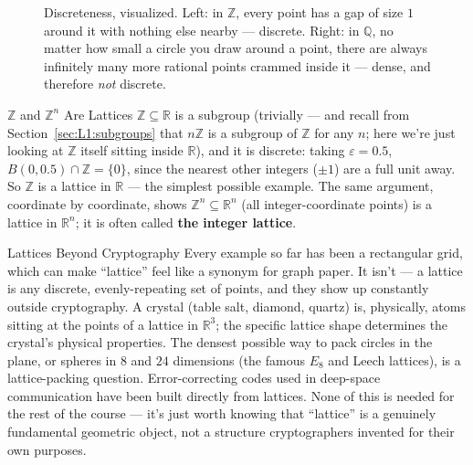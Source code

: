 \begin{figure}[ht]
\centering
{}
\caption{Discreteness, visualized. Left: in $\mathbb{Z}$, every point has a gap of size $1$ around it with nothing else nearby --- discrete. Right: in $\mathbb{Q}$, no matter how small a circle you draw around a point, there are always infinitely many more rational points crammed inside it --- dense, and therefore \emph{not} discrete.}
\label{fig:discrete}
\end{figure}

\begin{exbox}{$\mathbb{Z}$ and $\mathbb{Z}^n$ Are Lattices}
$\mathbb{Z} \subseteq \mathbb{R}$ is a subgroup (trivially --- and recall from Section~\ref{sec:L1:subgroups} that $n\mathbb{Z}$ is a subgroup of $\mathbb{Z}$ for any $n$; here we're just looking at $\mathbb{Z}$ itself sitting inside $\mathbb{R}$), and it is discrete: taking $\varepsilon = 0.5$, $B(0, 0.5) \cap \mathbb{Z} = \{0\}$, since the nearest other integers ($\pm 1$) are a full unit away. So $\mathbb{Z}$ is a lattice in $\mathbb{R}$ --- the simplest possible example. The same argument, coordinate by coordinate, shows $\mathbb{Z}^n \subseteq \mathbb{R}^n$ (all integer-coordinate points) is a lattice in $\mathbb{R}^n$; it is often called \textbf{the integer lattice}.
\end{exbox}

\begin{factbox}{Lattices Beyond Cryptography}
Every example so far has been a rectangular grid, which can make ``lattice'' feel like a synonym for graph paper. It isn't --- a lattice is any discrete, evenly-repeating set of points, and they show up constantly outside cryptography. A crystal (table salt, diamond, quartz) is, physically, atoms sitting at the points of a lattice in $\mathbb{R}^3$; the specific lattice shape determines the crystal's physical properties. The densest possible way to pack circles in the plane, or spheres in $8$ and $24$ dimensions (the famous $E_8$ and Leech lattices), is a lattice-packing question. Error-correcting codes used in deep-space communication have been built directly from lattices. None of this is needed for the rest of the course --- it's just worth knowing that ``lattice'' is a genuinely fundamental geometric object, not a structure cryptographers invented for their own purposes.
\end{factbox}

